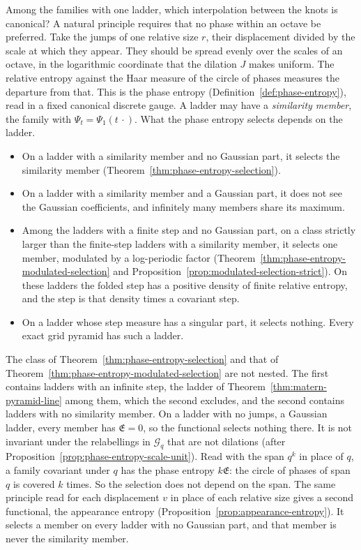 Among the families with one ladder, which interpolation between the knots is canonical? A natural
principle requires that no phase within an octave be preferred. Take the jumps of one relative size
$r$, their displacement divided by the scale at which they appear. They should be spread evenly over
the scales of an octave, in the logarithmic coordinate that the dilation $J$ makes uniform. The
relative entropy against the Haar measure of the circle of phases measures the departure from that.
This is the phase entropy (Definition~\ref{def:phase-entropy}), read in a fixed canonical discrete
gauge. A ladder may have a \emph{similarity member}, the family with $\Psi_t = \Psi_1(t\,\cdot)$.
What the phase entropy selects depends on the ladder.
\begin{itemize}
\item On a ladder with a similarity member and no Gaussian part, it selects the similarity member
(Theorem~\ref{thm:phase-entropy-selection}).
\item On a ladder with a similarity member and a Gaussian part, it does not see the Gaussian
coefficients, and infinitely many members share its maximum.
\item Among the ladders with a finite step and no Gaussian part, on a class strictly larger than
the finite-step ladders with a similarity member, it selects one member, modulated by a log-periodic factor
(Theorem~\ref{thm:phase-entropy-modulated-selection} and
Proposition~\ref{prop:modulated-selection-strict}). On these ladders the folded step has a
positive density of finite relative entropy, and the step is that density times a covariant step.
\item On a ladder whose step measure has a singular part, it selects nothing. Every exact grid
pyramid has such a ladder.
\end{itemize}
The class of Theorem~\ref{thm:phase-entropy-selection} and that of
Theorem~\ref{thm:phase-entropy-modulated-selection} are not nested. The first contains ladders with
an infinite step, the \Matern{} ladder of Theorem~\ref{thm:matern-pyramid-line} among them, which
the second excludes, and the second contains ladders with no similarity member. On a ladder with no
jumps, a Gaussian ladder, every member has $\mathfrak{E} = 0$, so the functional selects nothing
there. It is not invariant under the relabellings in $\mathcal{G}_q$ that are not dilations (after
Proposition~\ref{prop:phase-entropy-scale-unit}). Read with the span
$q^k$ in place of $q$, a family covariant under $q$ has the phase entropy $k\mathfrak{E}$: the
circle of phases of span $q$ is covered $k$ times. So the selection does not depend on the span.
The same principle read for each displacement $v$ in place of each relative size gives a second
functional, the appearance entropy (Proposition~\ref{prop:appearance-entropy}). It selects a member
on every ladder with no Gaussian part, and that member is never the similarity member.

